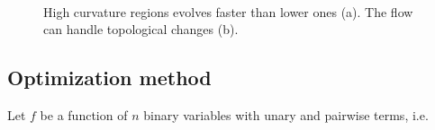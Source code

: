 \documentclass[runningheads]{llncs}
\begin{document}
\begin{figure}[!ht]
\center
{}\\%
\label{fig:mx-speed-variation-hole-filling}
\caption{High curvature regions evolves faster than lower ones (a). The flow can handle topological changes (b). }
\end{figure}


\subsection{Optimization method}

Let $f$ be a function of $n$ binary variables with unary and pairwise terms, i.e.
\end{document}
